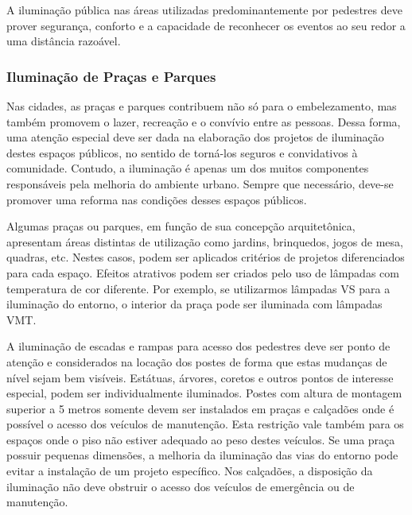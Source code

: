 A ilumina\c{c}\~ao p\'ublica nas \'areas utilizadas predominantemente por pedestres deve prover seguran\c{c}a, conforto e a capacidade de reconhecer os eventos ao seu redor a uma dist\^ancia razo\'avel. \cite{CemigMinas}

\subsubsection{Ilumina\c{c}\~ao de Pra\c{c}as e Parques}

Nas cidades, as pra\c{c}as e parques contribuem n\~ao s\'o para o embelezamento, mas tamb\'em promovem o lazer, recrea\c{c}\~ao e o conv\'ivio entre as pessoas. Dessa forma, uma aten\c{c}\~ao especial deve ser dada na elabora\c{c}\~ao dos projetos de ilumina\c{c}\~ao destes espa\c{c}os p\'ublicos, no sentido de torn\'a-los seguros e convidativos \`a comunidade. Contudo, a ilumina\c{c}\~ao \'e apenas um dos muitos componentes respons\'aveis pela melhoria do ambiente urbano. Sempre que necess\'ario, deve-se promover uma reforma nas condi\c{c}\~oes desses espa\c{c}os p\'ublicos.\cite{CemigMinas}

	Algumas pra\c{c}as ou parques, em fun\c{c}\~ao de sua concep\c{c}\~ao arquitet\^onica, apresentam \'areas distintas de utiliza\c{c}\~ao como jardins, brinquedos, jogos de mesa, quadras, etc. Nestes casos, podem ser aplicados crit\'erios de projetos diferenciados para cada espa\c{c}o. Efeitos atrativos podem ser criados pelo uso de l\^ampadas com temperatura de cor diferente. Por exemplo, se utilizarmos l\^ampadas VS para a ilumina\c{c}\~ao do entorno, o interior da pra\c{c}a pode ser iluminada com l\^ampadas VMT.\cite{CemigMinas}
	
	A ilumina\c{c}\~ao de escadas e rampas para acesso dos pedestres deve ser ponto de aten\c{c}\~ao e considerados na loca\c{c}\~ao dos postes de forma que estas mudan\c{c}as de n\'ivel sejam bem vis\'iveis. Est\'atuas, \'arvores, coretos e outros pontos de interesse especial, podem ser individualmente iluminados. Postes com altura de montagem superior a 5 metros somente devem ser instalados em pra\c{c}as e cal\c{c}ad\~oes onde \'e poss\'ivel o acesso dos ve\'iculos de manuten\c{c}\~ao. Esta restri\c{c}\~ao vale tamb\'em para os espa\c{c}os onde o piso n\~ao estiver adequado ao peso destes ve\'iculos. Se uma pra\c{c}a possuir pequenas dimens\~oes, a melhoria da ilumina\c{c}\~ao das vias do entorno pode evitar a instala\c{c}\~ao de um projeto espec\'ifico. Nos cal\c{c}ad\~oes, a disposi\c{c}\~ao da ilumina\c{c}\~ao n\~ao deve obstruir o acesso dos ve\'iculos de emerg\^encia ou de manuten\c{c}\~ao. \cite{CemigMinas} 

